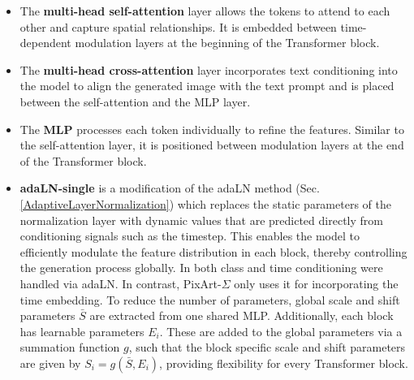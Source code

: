 \begin{itemize}
	\item The \textbf{multi-head self-attention} layer allows the tokens to attend to each other and capture spatial relationships. It is embedded between time-dependent modulation layers at the beginning of the Transformer block. 
	
	\item The \textbf{multi-head cross-attention} layer incorporates text conditioning into the model to align the generated image with the text prompt and is placed between the self-attention and the \gls{MLP} layer. 
	
	\item The \textbf{\gls{MLP}} processes each token individually to refine the features. Similar to the self-attention layer, it is positioned between modulation layers at the end of the Transformer block. 
	
	\item \textbf{adaLN-single} is a modification of the \gls{adaLN} method \cite{adaLN} (Sec. \ref{AdaptiveLayerNormalization}) which replaces the static parameters of the normalization layer with dynamic values that are predicted directly from conditioning signals such as the timestep. This enables the model to efficiently modulate the feature distribution in each block, thereby controlling the generation process globally. In \cite{DiT} both class and time conditioning were handled via adaLN. In contrast, PixArt-$\Sigma$ only uses it for incorporating the time embedding. To reduce the number of parameters, global scale and shift parameters $\bar{S}$ are extracted from one shared \gls{MLP}. Additionally, each block has learnable parameters $E_i$. These are added to the global parameters via a summation function $g$, such that the block specific scale and shift parameters are given by $S_i = g(\bar{S}, E_i)$, providing flexibility for every Transformer block.
	
\end{itemize}

%
%


